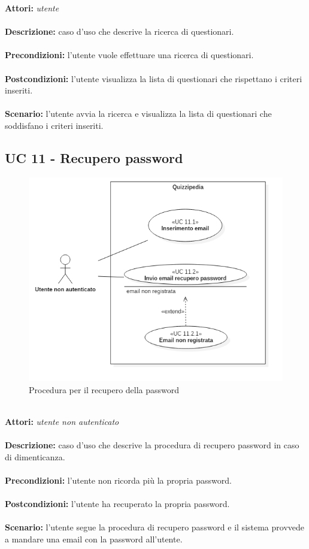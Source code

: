 \documentclass[a4paper,11pt]{article}
\begin{document}

\textbf{Attori:} \textit{utente}
\\ \\
\textbf{Descrizione:} caso d'uso che descrive la ricerca di questionari.\\
\\
\textbf{Precondizioni:} l'utente vuole effettuare una ricerca di questionari.\\
\\
\textbf{Postcondizioni:} l’utente visualizza la lista di questionari che rispettano i criteri inseriti.\\
\\
\textbf{Scenario:} l’utente avvia la ricerca e visualizza la lista di questionari che soddisfano i criteri inseriti.\\	
	\newpage

\subsection{UC 11 - Recupero password}

\begin{figure}[h!]
\centering
\includegraphics[scale=0.6]{../immagini/UC11.png}
\caption{Procedura per il recupero della password}
\end{figure}
\ \\
\textbf{Attori:} \textit{utente non autenticato}
\\ \\
\textbf{Descrizione:} caso d'uso che descrive la procedura di recupero password in caso di dimenticanza.\\
\\
\textbf{Precondizioni:} l'utente non ricorda più la propria password.\\
\\
\textbf{Postcondizioni:} l’utente ha recuperato la propria password.\\
\\
\textbf{Scenario:} l’utente segue la procedura di recupero password e il sistema provvede a mandare una email con la password all'utente.\\
\end{document}
